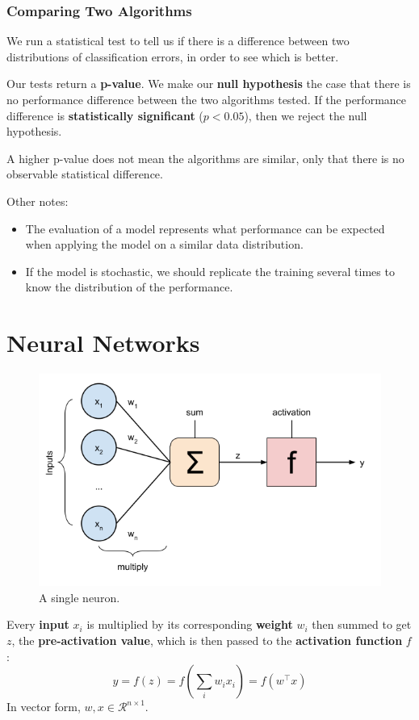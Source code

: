\documentclass[11pt]{article}
\begin{document}
\subsubsection{Comparing Two Algorithms}
We run a statistical test to tell us if there is a difference between two distributions of classification errors, in order to see which is better.

Our tests return a \textbf{p-value}.
We make our \textbf{null hypothesis} the case that there is no performance difference between the two algorithms tested.
If the performance difference is \textbf{statistically significant} ($p < 0.05$), then we reject the null hypothesis.

A higher p-value does not mean the algorithms are similar, only that there is no observable statistical difference.

Other notes:
\begin{itemize}
  \item The evaluation of a model represents what performance can be expected when applying the model on a similar data distribution.
  \item If the model is stochastic, we should replicate the training several times to know the distribution of the performance.
\end{itemize}

\section{Neural Networks}
\begin{figure}[htb!]
  \centering
  \caption{A single neuron.}
  \includegraphics[scale=0.5]{neuron}
\end{figure}

Every \textbf{input} $x_i$ is multiplied by its corresponding \textbf{weight} $w_i$ then summed to get $z$, the \textbf{pre-activation value}, which is then passed to the \textbf{activation function} $f$:
\[
  y = f(z) = f \left( \sum_i w_i x_i \right) = f (w^\intercal x)
\]
In vector form, $w, x \in \mathcal{R}^{n \times 1}$.
\end{document}
